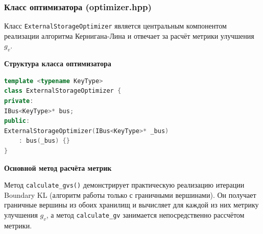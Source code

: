 \subsubsection{Класс оптимизатора (optimizer.hpp)}

Класс \texttt{ExternalStorageOptimizer} является центральным компонентом реализации алгоритма Кернигана-Лина и отвечает за расчёт метрики улучшения $g_v$.

\textbf{Структура класса оптимизатора}

\begin{lstlisting}[language=C++, caption=Класс StorageOptimizer, label=lst:optimizer1]
template <typename KeyType>
class ExternalStorageOptimizer {
private:
IBus<KeyType>* bus;
public:
ExternalStorageOptimizer(IBus<KeyType>* _bus)
    : bus(_bus) {}
}
\end{lstlisting}

\textbf{Основной метод расчёта метрик}

Метод \texttt{calculate\_gvs()} демонстрирует практическую реализацию итерации Boundary KL (алгоритм работы только с граничными вершинами). Он получает граничные вершины из обоих хранилищ и вычисляет для каждой из них метрику улучшения $g_v$, а метод \texttt{calculate\_gv} занимается непосредственно рассчётом метрики.

